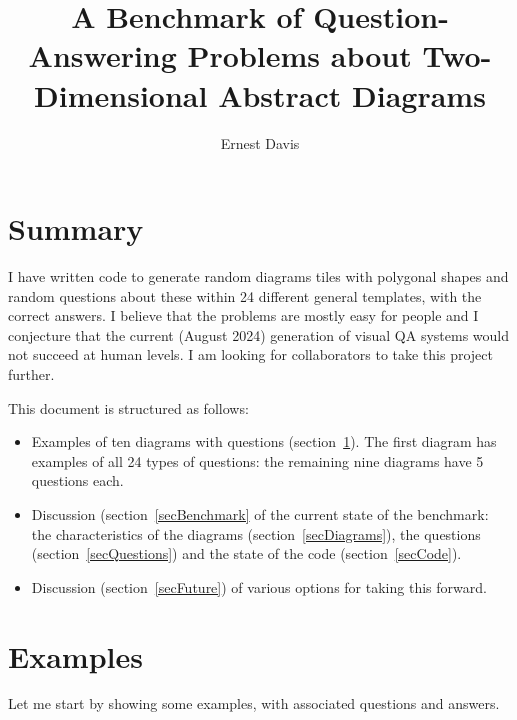 \documentclass{article}    %
\title{A Benchmark of Question-Answering Problems about Two-Dimensional
Abstract Diagrams}
\author{Ernest Davis}
\begin{document}
\maketitle
\section*{Summary}
I have written code to generate random diagrams tiles with polygonal shapes
and random questions about these within 24 different general templates,
with the correct answers.
I believe that the problems are mostly easy for people and I conjecture 
that the current (August 2024) generation of visual QA systems would not
succeed at human levels. I am looking for collaborators to take this
project further.

This document is structured as follows:
\begin{itemize}
\item[1.] Examples of ten diagrams with questions (section~\ref{secExamples}).
The first diagram has examples
of all 24 types of questions: the remaining nine diagrams have 5
questions each.

\item[2.] Discussion (section~\ref{secBenchmark} of the current 
state of the benchmark: the characteristics of
the diagrams (section~\ref{secDiagrams}), the questions 
(section~\ref{secQuestions}) and the state of the code (section~\ref{secCode}).

\item[3.] Discussion (section~\ref{secFuture}) of various options for
taking this forward.
\end{itemize}

\section{Examples}
\label{secExamples}

Let me start by showing some examples, with associated questions and answers.
\end{document}
